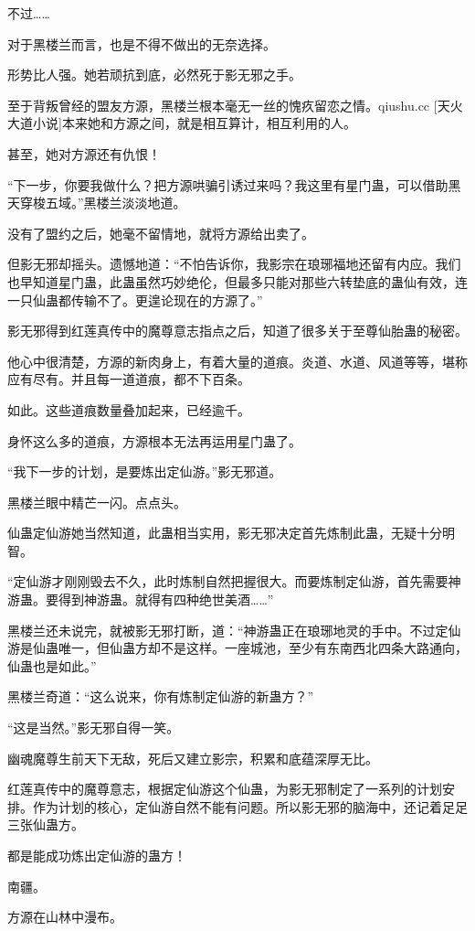 \begin{this_body}
不过……

对于黑楼兰而言，也是不得不做出的无奈选择。

形势比人强。她若顽抗到底，必然死于影无邪之手。

至于背叛曾经的盟友方源，黑楼兰根本毫无一丝的愧疚留恋之情。qiushu.cc [天火大道小说]本来她和方源之间，就是相互算计，相互利用的人。

甚至，她对方源还有仇恨！

“下一步，你要我做什么？把方源哄骗引诱过来吗？我这里有星门蛊，可以借助黑天穿梭五域。”黑楼兰淡淡地道。

没有了盟约之后，她毫不留情地，就将方源给出卖了。

但影无邪却摇头。遗憾地道：“不怕告诉你，我影宗在琅琊福地还留有内应。我们也早知道星门蛊，此蛊虽然巧妙绝伦，但最多只能对那些六转垫底的蛊仙有效，连一只仙蛊都传输不了。更遑论现在的方源了。”

影无邪得到红莲真传中的魔尊意志指点之后，知道了很多关于至尊仙胎蛊的秘密。

他心中很清楚，方源的新肉身上，有着大量的道痕。炎道、水道、风道等等，堪称应有尽有。并且每一道道痕，都不下百条。

如此。这些道痕数量叠加起来，已经逾千。

身怀这么多的道痕，方源根本无法再运用星门蛊了。

“我下一步的计划，是要炼出定仙游。”影无邪道。

黑楼兰眼中精芒一闪。点点头。

仙蛊定仙游她当然知道，此蛊相当实用，影无邪决定首先炼制此蛊，无疑十分明智。

“定仙游才刚刚毁去不久，此时炼制自然把握很大。而要炼制定仙游，首先需要神游蛊。要得到神游蛊。就得有四种绝世美酒……”

黑楼兰还未说完，就被影无邪打断，道：“神游蛊正在琅琊地灵的手中。不过定仙游是仙蛊唯一，但仙蛊方却不是这样。一座城池，至少有东南西北四条大路通向，仙蛊也是如此。”

黑楼兰奇道：“这么说来，你有炼制定仙游的新蛊方？”

“这是当然。”影无邪自得一笑。

幽魂魔尊生前天下无敌，死后又建立影宗，积累和底蕴深厚无比。

红莲真传中的魔尊意志，根据定仙游这个仙蛊，为影无邪制定了一系列的计划安排。作为计划的核心，定仙游自然不能有问题。所以影无邪的脑海中，还记着足足三张仙蛊方。

都是能成功炼出定仙游的蛊方！

南疆。

方源在山林中漫布。


\end{this_body}
